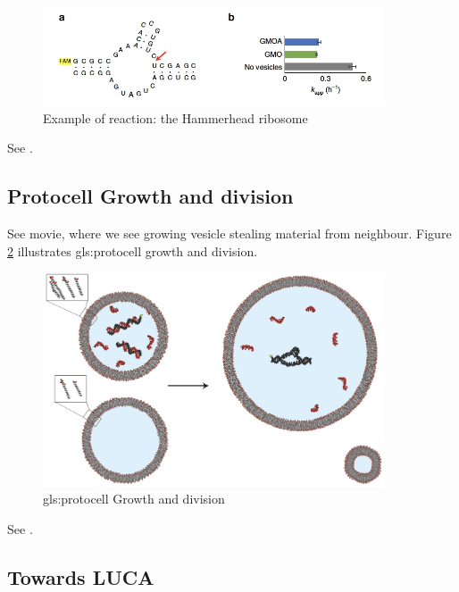 \documentclass[]{article}
\begin{document}
\begin{figure}[H]
	\caption{Example of reaction: the Hammerhead ribosome}\label{fig:ProtocellsAndReactions3}
	\includegraphics[width=0.9\textwidth]{ProtocellsAndReactions3}
\end{figure}



See \cite{adamala2016programmable,monnard2015current}.

\subsection{Protocell Growth and division}
See movie, where we see growing vesicle stealing material from neighbour. 
Figure \ref{fig:ProtocellGrowthDivision} illustrates \Gls{gls:protocell} growth and division.  

\begin{figure}[H]
	\caption{\Gls{gls:protocell} Growth and division}\label{fig:ProtocellGrowthDivision}
	\includegraphics[width=0.9\textwidth]{ProtocellGrowthDivision}
\end{figure}

See  \cite{zhu2012photochemically,chen2004emergence}.

\subsection{Towards LUCA}
\end{document}
